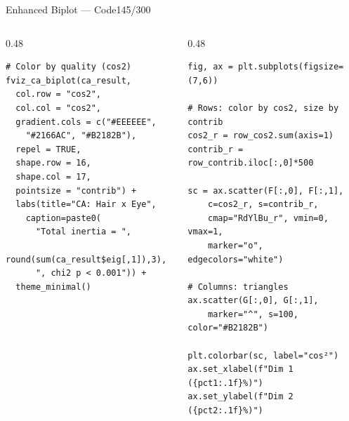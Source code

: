 \documentclass[10pt]{beamer}
\newcommand{\smark}[1]{\hfill{\scriptsize\color{codegray}#1}}
\begin{document}
\begin{frame}[fragile]{Enhanced Biplot --- Code}\smark{145/300}
\begin{columns}[T]
\begin{column}{0.48\textwidth}
\begin{lstlisting}[style=Rstyle]
# Color by quality (cos2)
fviz_ca_biplot(ca_result,
  col.row = "cos2",
  col.col = "cos2",
  gradient.cols = c("#EEEEEE",
    "#2166AC", "#B2182B"),
  repel = TRUE,
  shape.row = 16,
  shape.col = 17,
  pointsize = "contrib") +
  labs(title="CA: Hair x Eye",
    caption=paste0(
      "Total inertia = ",
      round(sum(ca_result$eig[,1]),3),
      ", chi2 p < 0.001")) +
  theme_minimal()
\end{lstlisting}
\end{column}
\begin{column}{0.48\textwidth}
\begin{lstlisting}[style=Pystyle]
fig, ax = plt.subplots(figsize=(7,6))

# Rows: color by cos2, size by contrib
cos2_r = row_cos2.sum(axis=1)
contrib_r = row_contrib.iloc[:,0]*500

sc = ax.scatter(F[:,0], F[:,1],
    c=cos2_r, s=contrib_r,
    cmap="RdYlBu_r", vmin=0, vmax=1,
    marker="o", edgecolors="white")

# Columns: triangles
ax.scatter(G[:,0], G[:,1],
    marker="^", s=100, color="#B2182B")

plt.colorbar(sc, label="cos²")
ax.set_xlabel(f"Dim 1 ({pct1:.1f}%)")
ax.set_ylabel(f"Dim 2 ({pct2:.1f}%)")
\end{lstlisting}
\end{column}
\end{columns}
\end{frame}
\end{document}
